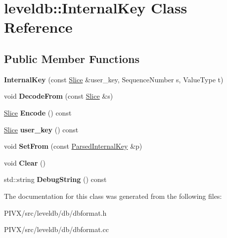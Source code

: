 \hypertarget{classleveldb_1_1_internal_key}{}\section{leveldb\+:\+:Internal\+Key Class Reference}
\label{classleveldb_1_1_internal_key}
\subsection*{Public Member Functions}
\begin{DoxyCompactItemize}
\item 
\mbox{\label{classleveldb_1_1_internal_key_af436814d1667db55e93b6bd583619617}} 
{\bfseries Internal\+Key} (const \mbox{\hyperlink{classleveldb_1_1_slice}{Slice}} \&user\+\_\+key, Sequence\+Number s, Value\+Type t)
\item 
\mbox{\label{classleveldb_1_1_internal_key_a5a8c9bced0ba968b6b62d91cfb19a82a}} 
void {\bfseries Decode\+From} (const \mbox{\hyperlink{classleveldb_1_1_slice}{Slice}} \&s)
\item 
\mbox{\label{classleveldb_1_1_internal_key_a0cb2fdabc879bdbe7afc3ba12152384c}} 
\mbox{\hyperlink{classleveldb_1_1_slice}{Slice}} {\bfseries Encode} () const
\item 
\mbox{\label{classleveldb_1_1_internal_key_a9673dbb181eaa977e6f09c45b02938bc}} 
\mbox{\hyperlink{classleveldb_1_1_slice}{Slice}} {\bfseries user\+\_\+key} () const
\item 
\mbox{\label{classleveldb_1_1_internal_key_ada9566cd92b6b9784ab7f2f6f71d0a4e}} 
void {\bfseries Set\+From} (const \mbox{\hyperlink{structleveldb_1_1_parsed_internal_key}{Parsed\+Internal\+Key}} \&p)
\item 
\mbox{\label{classleveldb_1_1_internal_key_ab6e9ebec1bf567de89d8dd34fdc51f86}} 
void {\bfseries Clear} ()
\item 
\mbox{\label{classleveldb_1_1_internal_key_ad5812d3c90842906266e50b5a5911f84}} 
std\+::string {\bfseries Debug\+String} () const
\end{DoxyCompactItemize}


The documentation for this class was generated from the following files\+:\begin{DoxyCompactItemize}
\item 
P\+I\+V\+X/src/leveldb/db/dbformat.\+h\item 
P\+I\+V\+X/src/leveldb/db/dbformat.\+cc\end{DoxyCompactItemize}
